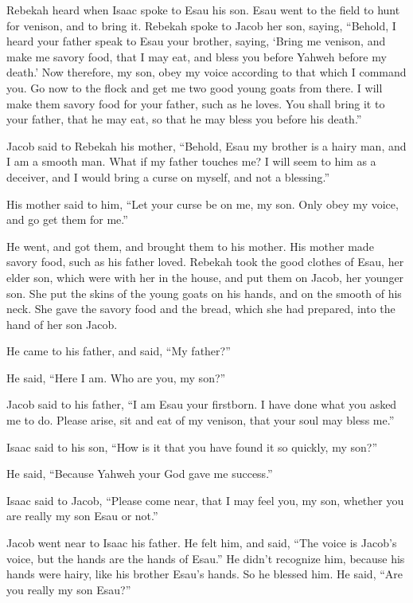  Rebekah heard when Isaac spoke to Esau his son. Esau went
to the field to hunt for venison, and to bring it. 
Rebekah spoke to Jacob her son, saying, ``Behold, I heard your father
speak to Esau your brother, saying,  `Bring me venison,
and make me savory food, that I may eat, and bless you before Yahweh
before my death.'  Now therefore, my son, obey my voice
according to that which I command you.  Go now to the
flock and get me two good young goats from there. I will make them
savory food for your father, such as he loves.  You shall
bring it to your father, that he may eat, so that he may bless you
before his death.''

 Jacob said to Rebekah his mother, ``Behold, Esau my
brother is a hairy man, and I am a smooth man.  What if
my father touches me? I will seem to him as a deceiver, and I would
bring a curse on myself, and not a blessing.''

 His mother said to him, ``Let your curse be on me, my
son. Only obey my voice, and go get them for me.''

 He went, and got them, and brought them to his mother.
His mother made savory food, such as his father loved. 
Rebekah took the good clothes of Esau, her elder son, which were with
her in the house, and put them on Jacob, her younger son.
 She put the skins of the young goats on his hands, and
on the smooth of his neck.  She gave the savory food and
the bread, which she had prepared, into the hand of her son Jacob.

 He came to his father, and said, ``My father?''

He said, ``Here I am. Who are you, my son?''

 Jacob said to his father, ``I am Esau your firstborn. I
have done what you asked me to do. Please arise, sit and eat of my
venison, that your soul may bless me.''

 Isaac said to his son, ``How is it that you have found
it so quickly, my son?''

He said, ``Because Yahweh your God gave me success.''

 Isaac said to Jacob, ``Please come near, that I may feel
you, my son, whether you are really my son Esau or not.''

 Jacob went near to Isaac his father. He felt him, and
said, ``The voice is Jacob's voice, but the hands are the hands of
Esau.''  He didn't recognize him, because his hands were
hairy, like his brother Esau's hands. So he blessed him. 
He said, ``Are you really my son Esau?''


